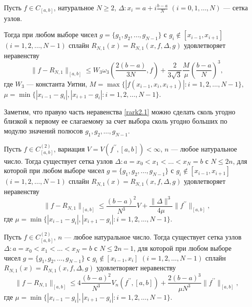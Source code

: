 \begin{theorem}\label{rarkteor2.1}
Пусть $f\in C_{[a,b]}$, натуральное $N\geqslant 2$, $\Delta: x_i=a+i\frac{b-a}N$
$(i=0,1,\dots,N)$ --- сетка узлов.

Тогда при любом выборе чисел $g=\{g_1, g_2, \dots,g_{N-1}\}$
с $g_i\not \in [x_{i-1}, x_{i+1}]$ $(i=1,2,\dots,N-1)$ сплайн
 $R_{N,1} (x)=R_{N,1} (x, f, \Delta, g)$ удовлетворяет неравенству
\begin{equation}\label{rark2.1}
\|f-R_{N,1}\|_{[a,b]}\leqslant W_3 \omega_3 \left(\frac{2(b-a)}{3N},f\right)+
\frac 2{3\sqrt 3}\frac M \mu \left(\frac{b-a}N\right)^3,
\end{equation}
где $W_3$ --- константа Уитни,
$M=\max\{|f(x_{i-1}, x_i, x_{i+1})|: i=1,2,\dots,N-1\},$
\newline $\mu=\min\{|x_{i-1}-g_i|, |x_{i+1}-g_i|: i=1,2,\dots,N-1\}.$
\end{theorem}



Заметим, что правую часть неравенства \eqref{rark2.1} можно сделать сколь угодно близкой к первому ее слагаемому за счет выбора сколь угодно больших по модулю значений полюсов
$g_1,g_2,\dots, g_{N-1}$.

\begin{theorem}\label{rarkteor2.2}
Пусть $f\in C^{(2)}_{[a,b]}$, вариация $V=V(f^{\prime\prime}, [a,b])<\infty$,
$n$ --- любое натуральное число.
Тогда существует сетка узлов $\Delta: a=x_0<x_1<\dots<x_N=b$ с $N\leqslant 2n$, для
которой при любом выборе чисел $g=\{g_1, g_2,\dots,g_{N-1}\}$ с $g_i\not \in [x_{i-1}, x_{i+1}]$
$(i=1,2,\dots,N-1)$ сплайн $R_{N,1}(x)=R_{N,1}(x, f, \Delta, g)$ удовлетворяет
неравенству
\begin{equation}\label{rark2.7}
\|f-R_{N,1}\|_{[a,b]} \leqslant \frac{(b-a)^2}{N^3} V+
\frac{\|\Delta\|^3}{4\mu} \|f^{\prime\prime}\|_{[a,b]},
\end{equation}
где $\mu=\min\{|x_{i-1}-g_i|, |x_{i+1}-g_i|: i=1,2,\dots, N-1\}.$
\end{theorem}

\begin{theorem}\label{rarkteor2.3}
Пусть $f\in C^{(2)}_{[a,b]}$, $n$ --- любое натуральное число. Тогда существует сетка узлов
$\Delta: a=x_0<x_1<\dots<x_N=b$ с $N\leqslant 2n-1$, для которой при любом выборе чисел
$g=\{g_1,g_2,\dots,g_{N-1}\}$ с $g_i\not \in [x_{i-1}, x_i]$ $(i=1,2,\dots,N-1)$ сплайн
$R_{N,1}(x)=R_{N,1} (x, f, \Delta, g)$ удовлетворяет неравенству
\begin{equation}\label{rark2.13}
\|f-R_{N,1}\|_{[a,b]}\leqslant 4\frac{(b-a)^2}{N^3} V_n(f^{\prime\prime},[a,b])+
\frac{2(b-a)^3}{\mu N^3}\|f^{\prime\prime}\|_{[a,b]},
\end{equation}
где $\mu=\min\{|x_{i-1}-g_i|, |x_{i+1}-g_i|: i=1,2,\dots,N-1\}.$
\end{theorem}


